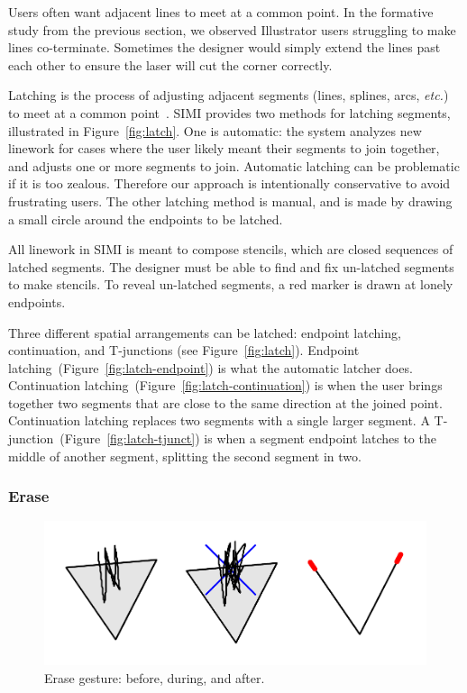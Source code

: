 \documentclass{article}
\begin{document}
Users often want adjacent lines to meet at a common point. In the
formative study from the previous section, we observed Illustrator
users struggling to make lines co-terminate. Sometimes the designer
would simply extend the lines past each other to ensure the laser will
cut the corner correctly.

Latching is the process of adjusting adjacent segments (lines,
splines, arcs, \textit{etc.}) to meet at a common
point~\cite{herot-latch-corners}. SIMI provides two methods for
latching segments, illustrated in Figure~\ref{fig:latch}. One is
automatic: the system analyzes new linework for cases where the user
likely meant their segments to join together, and adjusts one or more
segments to join. Automatic latching can be problematic if it is too
zealous. Therefore our approach is intentionally conservative to avoid
frustrating users. The other latching method is manual, and is made by
drawing a small circle around the endpoints to be latched.

All linework in SIMI is meant to compose stencils, which are closed
sequences of latched segments. The designer must be able to find and
fix un-latched segments to make stencils. To reveal un-latched
segments, a red marker is drawn at lonely endpoints.

Three different spatial arrangements can be latched: endpoint
latching, continuation, and T-junctions (see
Figure~\ref{fig:latch}). Endpoint
latching~(Figure~\ref{fig:latch-endpoint}) is what the automatic
latcher does. Continuation
latching~(Figure~\ref{fig:latch-continuation}) is when the user brings
together two segments that are close to the same direction at the
joined point. Continuation latching replaces two segments with a
single larger segment. A T-junction~(Figure~\ref{fig:latch-tjunct}) is
when a segment endpoint latches to the middle of another segment,
splitting the second segment in two.

\subsubsection{Erase}

\begin{figure}[h]
  \centering
  \includegraphics[width=0.9\linewidth]{img/erase-all.pdf}
  \caption{Erase gesture: before, during, and after.}
  \label{fig:erase}
\end{figure}
\end{document}
